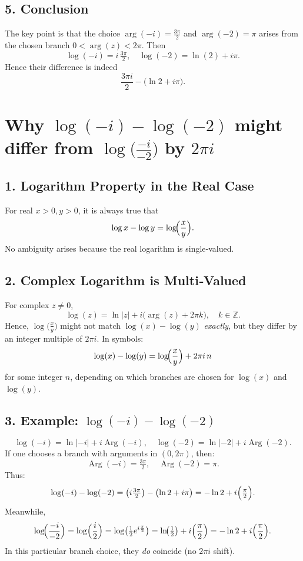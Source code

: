 \documentclass[12pt]{article}
\DeclareMathOperator{\Arg}{Arg}
\theoremstyle{definition} %
\theoremstyle{plain} %
\begin{document}
\subsection*{5. Conclusion}

The key point is that the choice $\arg(-i) = \tfrac{3\pi}{2}$ and $\arg(-2) = \pi$ arises from the chosen branch $0<\arg(z)<2\pi$. Then
\[
\log(-i) = i\,\tfrac{3\pi}{2},
\quad
\log(-2) = \ln(2) + i\pi.
\]
Hence their difference is indeed
\[
\frac{3\pi i}{2} - \bigl(\ln 2 + i\pi\bigr).
\]

\section*{Why \(\log(-i) - \log(-2)\) might differ from \(\log\bigl(\tfrac{-i}{-2}\bigr)\) by \(2\pi i\)}

\subsection*{1. Logarithm Property in the Real Case}

For real \(x>0, y>0\), it is always true that
\[
\log x - \log y = \log\!\Bigl(\frac{x}{y}\Bigr).
\]
No ambiguity arises because the real logarithm is single‐valued.

\subsection*{2. Complex Logarithm is Multi‐Valued}

For complex \(z\neq0\),
\[
\log(z) = \ln|z| + i\bigl(\arg(z) + 2\pi k\bigr),
\quad k \in \mathbb{Z}.
\]
Hence, \(\log\!\bigl(\tfrac{x}{y}\bigr)\) might not match \(\log(x) - \log(y)\) \emph{exactly}, but they differ by an integer multiple of \(2\pi i\). In symbols:
\[
\log(x) - \log(y) 
= \log\!\Bigl(\frac{x}{y}\Bigr) + 2\pi i\,n
\]
for some integer \(n\), depending on which branches are chosen for \(\log(x)\) and \(\log(y)\).

\subsection*{3. Example: \(\log(-i) - \log(-2)\)}

\[
\log(-i) = \ln|-i| + i\Arg(-i),
\quad
\log(-2) = \ln|-2| + i\Arg(-2).
\]
If one chooses a branch with arguments in \((0,2\pi)\), then:
\[
\Arg(-i) = \tfrac{3\pi}{2}, 
\quad
\Arg(-2) = \pi.
\]
Thus:
\[
\log(-i) - \log(-2) 
= \bigl(i\tfrac{3\pi}{2}\bigr) - \bigl(\ln 2 + i\pi\bigr)
= -\ln 2 + i\Bigl(\tfrac{\pi}{2}\Bigr).
\]
Meanwhile,
\[
\log\!\Bigl(\frac{-i}{-2}\Bigr)
= \log\Bigl(\frac{i}{2}\Bigr)
= \log\bigl(\tfrac{1}{2}e^{i\frac{\pi}{2}}\bigr)
= \ln\!\bigl(\tfrac12\bigr) + i\Bigl(\frac{\pi}{2}\Bigr)
= -\ln 2 + i\Bigl(\frac{\pi}{2}\Bigr).
\]
In this particular branch choice, they \emph{do} coincide (no $2\pi i$ shift).
\end{document}
